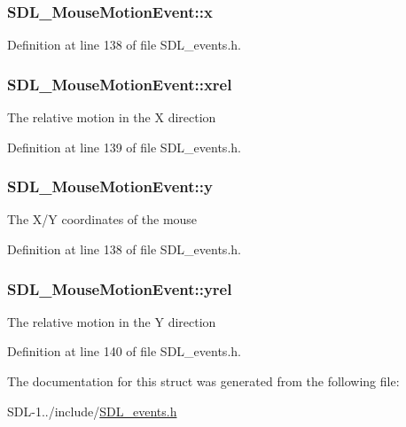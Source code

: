 \subsubsection[{x}]{ S\+D\+L\+\_\+\+Mouse\+Motion\+Event\+::x}\label{struct_s_d_l___mouse_motion_event_abf5b246feb0afbcabcef22b924eda8c3}


Definition at line 138 of file S\+D\+L\+\_\+events.\+h.

\hypertarget{struct_s_d_l___mouse_motion_event_a84d307cc7d52073852497d8846f0a7c5}{}
\subsubsection[{xrel}]{ S\+D\+L\+\_\+\+Mouse\+Motion\+Event\+::xrel}\label{struct_s_d_l___mouse_motion_event_a84d307cc7d52073852497d8846f0a7c5}
The relative motion in the X direction 

Definition at line 139 of file S\+D\+L\+\_\+events.\+h.

\hypertarget{struct_s_d_l___mouse_motion_event_ac7d0f0463c27e6d8e154efe5cc6c1897}{}
\subsubsection[{y}]{ S\+D\+L\+\_\+\+Mouse\+Motion\+Event\+::y}\label{struct_s_d_l___mouse_motion_event_ac7d0f0463c27e6d8e154efe5cc6c1897}
The X/\+Y coordinates of the mouse 

Definition at line 138 of file S\+D\+L\+\_\+events.\+h.

\hypertarget{struct_s_d_l___mouse_motion_event_a371e2cd4087a507663e512436fb4009b}{}
\subsubsection[{yrel}]{ S\+D\+L\+\_\+\+Mouse\+Motion\+Event\+::yrel}\label{struct_s_d_l___mouse_motion_event_a371e2cd4087a507663e512436fb4009b}
The relative motion in the Y direction 

Definition at line 140 of file S\+D\+L\+\_\+events.\+h.



The documentation for this struct was generated from the following file\+:\begin{DoxyCompactItemize}
\item 
S\+D\+L-\/1../include/\hyperlink{_s_d_l__events_8h}{S\+D\+L\+\_\+events.\+h}\end{DoxyCompactItemize}

